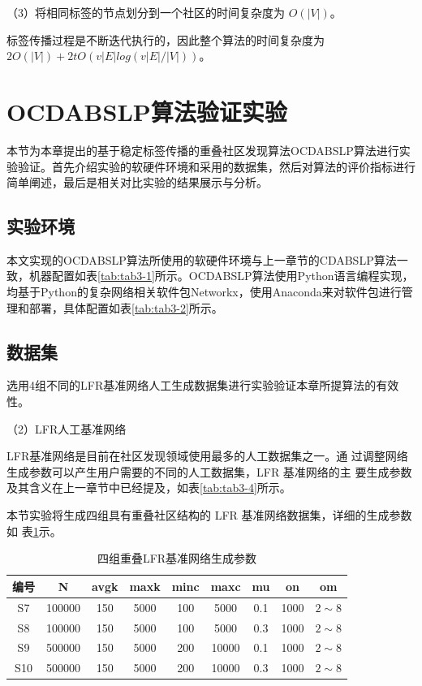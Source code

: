 （3）将相同标签的节点划分到一个社区的时间复杂度为 $O(|V|)$。 

标签传播过程是不断迭代执行的，因此整个算法的时间复杂度为
$2O(|V|)+2tO(v|E|log(v|E|/|V|))$。


\section{OCDABSLP算法验证实验}
本节为本章提出的基于稳定标签传播的重叠社区发现算法OCDABSLP算法进行实验验证。首先介绍实验的软硬件环境和采用的数据集，然后对算法的评价指标进行简单阐述，最后是相关对比实验的结果展示与分析。

\subsection{实验环境}
本文实现的OCDABSLP算法所使用的软硬件环境与上一章节的CDABSLP算法一致，机器配置如表\ref{tab:tab3-1}所示。OCDABSLP算法使用Python语言编程实现，均基于Python的复杂网络相关软件包Networkx，使用Anaconda来对软件包进行管理和部署，具体配置如表\ref{tab:tab3-2}所示。

\subsection{数据集}
选用4组不同的LFR基准网络人工生成数据集进行实验验证本章所提算法的有效性。 

（2）LFR人工基准网络

LFR基准网络是目前在社区发现领域使用最多的人工数据集之一。通
过调整网络生成参数可以产生用户需要的不同的人工数据集，LFR 基准网络的主
要生成参数及其含义在上一章节中已经提及，如表\ref{tab:tab3-4}所示。

本节实验将生成四组具有重叠社区结构的 LFR 基准网络数据集，详细的生成参数如
表\ref{tab:tab4-1}示。 

\begin{table}
  \centering
  \caption{四组重叠LFR基准网络生成参数} \label{tab:tab4-1}
  \begin{tabular*}{0.9\textwidth}{@{\extracolsep{\fill}}ccccccccc}
  \toprule
    编号		&N  &avgk &maxk &minc &maxc &mu &on &om\\
  \midrule
    S7	&100000  &150 &5000 &100 &5000 &0.1 &1000 &$2\sim 8$\\
    S8 &100000  &150 &5000 &100 &5000 &0.3 &1000 &$2\sim 8$\\
    S9 &500000  &150 &5000 &200 &10000 &0.1 &1000 &$2\sim 8$\\
    S10 &500000  &150 &5000 &200 &10000 &0.3 &1000 &$2\sim 8$\\
  \bottomrule
  \end{tabular*}
\end{table}

